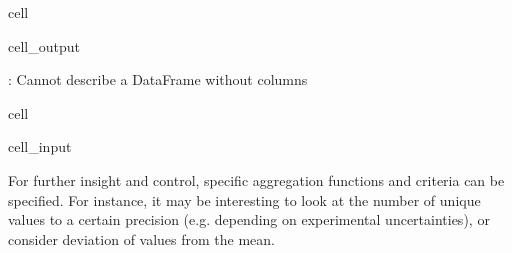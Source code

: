 \documentclass[letterpaper,table,10pt,english]{jupyterBook}
\begin{document}
\begin{sphinxuseclass}{cell}
\begin{sphinxVerbatimOutput}
\begin{sphinxuseclass}{cell_output}
\begin{sphinxVerbatim}[commandchars=\\\{\}]
: Cannot describe a DataFrame without columns
\end{sphinxVerbatim}

\end{sphinxuseclass}\end{sphinxVerbatimOutput}

\end{sphinxuseclass}
\begin{sphinxuseclass}{cell}\begin{sphinxVerbatimInput}

\begin{sphinxuseclass}{cell_input}
\begin{sphinxVerbatim}[commandchars=\\\{\}]
\end{sphinxVerbatim}

\end{sphinxuseclass}\end{sphinxVerbatimInput}

\end{sphinxuseclass}
\sphinxAtStartPar
For further insight and control, specific aggregation functions and criteria can be specified. For instance, it may be interesting to look at the number of unique values to a certain precision (e.g. depending on experimental uncertainties), or consider deviation of values from the mean.
\end{document}
